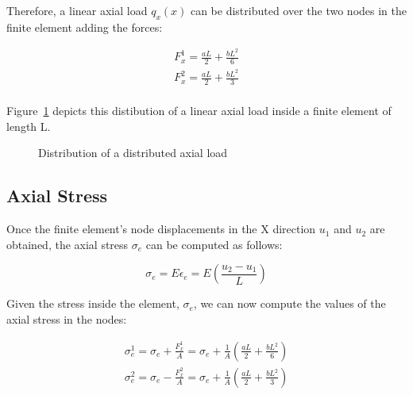 Therefore, a linear axial load $q_x(x)$ can be distributed over the two nodes in the finite element adding the forces:

\begin{equation}
  \begin{split}
    F_x^1 = \frac{a L}{2} + \frac{b L^2}{6} \\
    F_x^2 = \frac{a L}{2} + \frac{b L^2}{3} \\
  \end{split}
\end{equation}

Figure~\ref{fig:axial_finite_element_load_distribution} depicts this distibution of a linear axial load inside a finite element of length L.

\begin{figure}[h]
  \label{fig:axial_finite_element_load_distribution}
  \centering
  \caption{Distribution of a distributed axial load}
\end{figure}


\subsection{Axial Stress}

Once the finite element's node displacements in the X direction $u_1$ and $u_2$ are obtained, the axial stress $\sigma_e$ can be computed as follows:

\[
  \sigma_e = E \epsilon_e = E \left( \frac{u_2 - u_1}{L} \right)
\]

Given the stress inside the element, $\sigma_e$, we can now compute the values of the axial stress in the nodes:

\[
  \begin{split}
    \sigma_e^1 = \sigma_e + \frac{F_x^1}{A} = \sigma_e + \frac{1}{A} \left( \frac{a L}{2} + \frac{b L^2}{6} \right) \\
    \sigma_e^2 = \sigma_e - \frac{F_x^2}{A} = \sigma_e + \frac{1}{A} \left( \frac{a L}{2} + \frac{b L^2}{3} \right) \\
  \end{split}
\]

